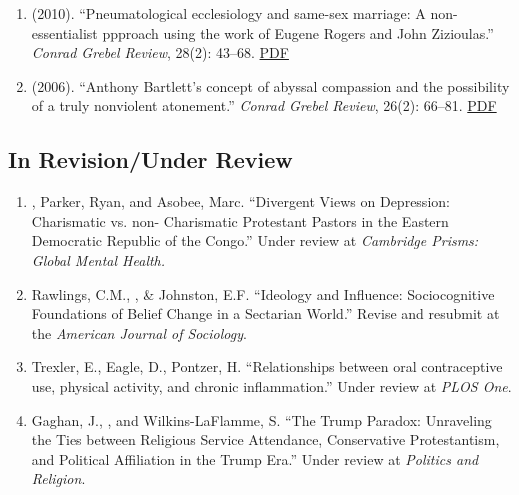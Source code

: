 \begin{enumerate}
\item \Eagle \hspace{.01em} (2010). ``Pneumatological ecclesiology and same-sex marriage: A non-essentialist ppproach using the work of Eugene Rogers and John Zizioulas.'' \emph{Conrad Grebel Review}, 28(2): 43--68. \href{https://www.davideagle.org/publication/eagle-pneumatological-ecclesiology-samesex-2010/eagle-pneumatological-ecclesiology-samesex-2010.pdf}{PDF}

\item \Eagle\hspace{.01em} (2006). ``Anthony Bartlett's concept of abyssal compassion and the possibility of a truly nonviolent atonement.'' \emph{Conrad Grebel Review}, 26(2): 66--81. \href{https://www.davideagle.org/publication/eagle-anthony-bartlett-concept-2006/eagle-anthony-bartlett-concept-2006.pdf}{PDF}

\end{enumerate}

\subsection*{In Revision/Under Review}
\begin{enumerate}
\item \Eagle, Parker, Ryan, and Asobee, Marc. ``Divergent Views on Depression: Charismatic vs. non- Charismatic Protestant Pastors in the Eastern Democratic Republic of the Congo.'' Under review at \textit{Cambridge Prisms: Global Mental Health.}

\item Rawlings, C.M., \Eagle, \& Johnston, E.F. ``Ideology and Influence:
Sociocognitive Foundations of Belief Change in a Sectarian World.'' Revise and resubmit at the \textit{American Journal of Sociology}.

\item Trexler, E., Eagle, D., Pontzer, H. ``Relationships between oral contraceptive use, physical activity, and chronic inflammation.'' Under review at \textit{PLOS One}.

\item Gaghan, J., \Eagle, and Wilkins-LaFlamme, S. ``The Trump Paradox: 
Unraveling the Ties between Religious Service Attendance, Conservative Protestantism, and Political Affiliation in the Trump Era.'' Under review at \textit{Politics and Religion}.

\end{enumerate}

